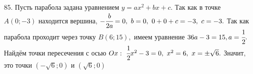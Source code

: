 85. Пусть парабола задана уравнением $y=ax^2+bx+c.$ Так как в точке $A(0;-3)$ находится вершина, $-\cfrac{b}{2a}=0,\ b=0,\ 0+0+c=-3,\ c=-3.$ Так как парабола проходит через точку $B(6;15),$ имеем уравнение $36a-3=15, a=\cfrac{1}{2}.$ Найдём точки пересечения с осью $Ox:\ \cfrac{1}{2}x^2-3=0,\ x^2=6,\ x=\pm\sqrt{6}.$ Значит, это точки $(-\sqrt{6};0)$ и $(\sqrt{6};0)$\\
